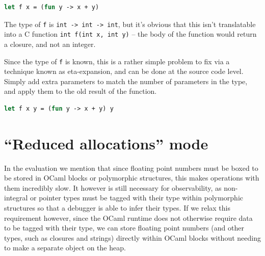 \begin{lstlisting}[language=Caml]
let f x = (fun y -> x + y)
\end{lstlisting}

The type of \texttt{f} is \texttt{int -> int -> int}, but it's obvious that this
isn't translatable into a C function \texttt{int f(int x, int y)} -- the body of
the function would return a closure, and not an integer.

Since the type of \texttt{f} is known, this is a rather simple problem to fix
via a technique known as eta-expansion, and can be done at the source code
level. Simply add extra parameters to match the number of parameters in the
type, and apply them to the old result of the function.

\begin{lstlisting}[language=Caml]
let f x y = (fun y -> x + y) y
\end{lstlisting}

\section{``Reduced allocations'' mode} \label{reduced-allocs}

In the evaluation we mention that since floating point numbers must be boxed to
be stored in OCaml blocks or polymorphic structures, this makes operations with
them incredibly slow.  It however is still necessary for observability, as
non-integral or pointer types must be tagged with their type within polymorphic
structures so that a debugger is able to infer their types. If we relax this
requirement however, since the OCaml runtime does not otherwise require data to
be tagged with their type, we can store floating point numbers (and other types,
such as closures and strings) directly within OCaml blocks without needing to
make a separate object on the heap.

